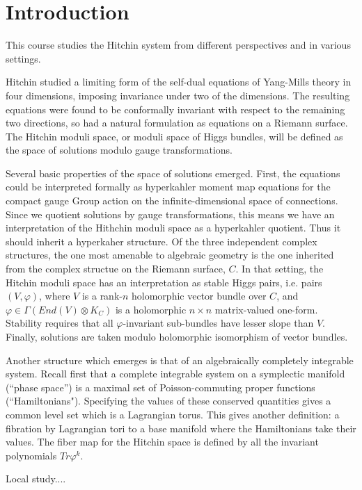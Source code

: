 \chapter{Introduction}

This course studies the Hitchin system from different perspectives and in various settings.

Hitchin studied a limiting form of the self-dual equations of Yang-Mills theory in four dimensions,
imposing invariance under two of the dimensions.  The resulting equations were found to be
conformally invariant with respect to the remaining two directions, so had a natural formulation
as equations on a Riemann surface.  The Hitchin moduli space, or moduli space of Higgs bundles,
will be defined as the space of solutions modulo gauge transformations.

Several basic properties of the space of solutions emerged.  First, the equations could be
interpreted formally as hyperkahler moment map equations for the compact gauge Group action
on the infinite-dimensional space of connections.  Since we quotient solutions by gauge
transformations, this means we have an interpretation of the Hithchin moduli space as a hyperkahler
quotient.  Thus it should inherit a hyperkaher structure.  Of the three independent complex structures,
the one most amenable to algebraic geometry is the one inherited from the complex
structue on the Riemann surface, $C$.  In that setting, the Hitchin moduli space has an
interpretation as stable Higgs pairs, i.e. pairs $(V,\varphi)$, where $V$ is a rank-$n$ holomorphic
vector bundle over $C$, and $\varphi\in \Gamma(End(V)\otimes K_C)$ is a holomorphic $n\times n$
matrix-valued one-form.  Stability requires that all $\varphi$-invariant sub-bundles have lesser slope
than $V$.  Finally, solutions are taken modulo holomorphic isomorphism of vector bundles.

Another structure which emerges is that of an algebraically completely integrable system.
Recall first that a complete integrable system on a symplectic manifold (``phase space'') is a
maximal set of Poisson-commuting proper functions (``Hamiltonians").  Specifying the values
of these conserved quantities gives a common level set which is a Lagrangian torus.
This gives another definition:  a fibration by Lagrangian tori to a base manifold where the
Hamiltonians take their values.  The fiber map for the Hitchin space is defined by all the
invariant polynomials $Tr\varphi^k$.

Local study....